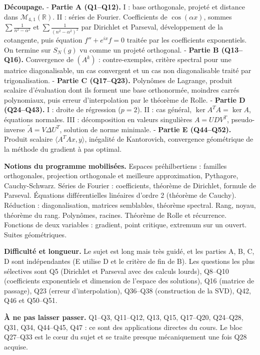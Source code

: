 \documentclass[11pt,a4paper]{article}
\begin{document}
\textbf{Découpage.}
- \textbf{Partie A (Q1--Q12).} I : base orthogonale, projeté et distance dans \(\mathcal M_{4,1}(\mathbb R)\). II : séries de Fourier. Coefficients de \(\cos(\alpha x)\), sommes \(\sum\frac1{n^2-\alpha^2}\) et \(\sum\frac1{(n^2-\alpha^2)^2}\) par Dirichlet et Parseval, développement de la cotangente, puis équation \(f''+e^{ix}f=0\) traitée par les coefficients exponentiels. On termine sur \(S_N(g)\) vu comme un projeté orthogonal.
- \textbf{Partie B (Q13--Q16).} Convergence de \((A^k)\) : contre-exemples, critère spectral pour une matrice diagonalisable, un cas convergent et un cas non diagonalisable traité par trigonalisation.
- \textbf{Partie C (Q17--Q23).} Polynômes de Lagrange, produit scalaire d'évaluation dont ils forment une base orthonormée, moindres carrés polynomiaux, puis erreur d'interpolation par le théorème de Rolle.
- \textbf{Partie D (Q24--Q43).} I : droite de régression (\(p=2\)). II : cas général, \(\ker A^TA=\ker A\), équations normales. III : décomposition en valeurs singulières \(A=UDV^T\), pseudo-inverse \(\tilde A=V\Delta U^T\), solution de norme minimale.
- \textbf{Partie E (Q44--Q52).} Produit scalaire \(\langle A^TAx,y\rangle\), inégalité de Kantorovich, convergence géométrique de la méthode du gradient à pas optimal.

\textbf{Notions du programme mobilisées.} Espaces préhilbertiens : familles orthogonales, projection orthogonale et meilleure approximation, Pythagore, Cauchy-Schwarz. Séries de Fourier : coefficients, théorème de Dirichlet, formule de Parseval. Équations différentielles linéaires d'ordre 2 (théorème de Cauchy). Réduction : diagonalisation, matrices semblables, théorème spectral. Rang, noyau, théorème du rang. Polynômes, racines. Théorème de Rolle et récurrence. Fonctions de deux variables : gradient, point critique, extremum sur un ouvert. Suites géométriques.

\textbf{Difficulté et longueur.} Le sujet est long mais très guidé, et les parties A, B, C, D sont indépendantes (E utilise D et le critère de fin de B). Les questions les plus sélectives sont Q5 (Dirichlet et Parseval avec des calculs lourds), Q8--Q10 (coefficients exponentiels et dimension de l'espace des solutions), Q16 (matrice de passage), Q23 (erreur d'interpolation), Q36--Q38 (construction de la SVD), Q42, Q46 et Q50--Q51.

\textbf{À ne pas laisser passer.} Q1--Q3, Q11--Q12, Q13, Q15, Q17--Q20, Q24--Q28, Q31, Q34, Q44--Q45, Q47 : ce sont des applications directes du cours. Le bloc Q27--Q33 est le cœur du sujet et se traite presque mécaniquement une fois Q28 acquise.
\end{document}
